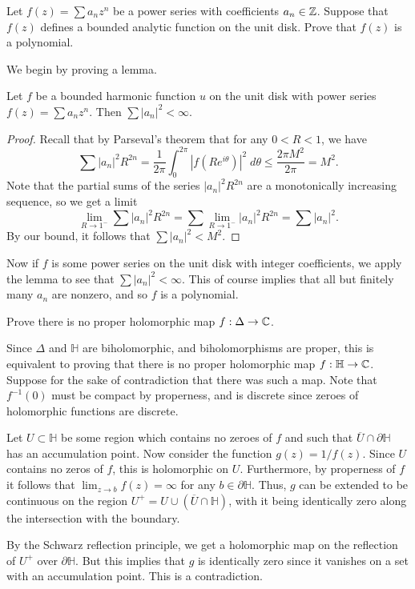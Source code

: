 \documentclass{pset}
\begin{document}
\begin{problem}{1.48}
  Let $f(z) = \sum a_n z^n$ be a power series with coefficients $a_n \in \mathbb{Z}$. Suppose that $f(z)$ defines a bounded analytic function on the unit disk. Prove that $f(z)$ is a polynomial.
\end{problem}

\begin{solution}
  We begin by proving a lemma.
  \begin{claim}
    Let $f$ be a bounded harmonic function $u$ on the unit disk with power series $f(z)=\sum a_n z^n$. Then $\sum |a_n|^2 < \infty$.
  \end{claim}

  \begin{proof}
    Recall that by Parseval's theorem that for any $0<R<1$, we have
    \[
      \sum |a_n|^2 R^{2n} = \frac{1}{2\pi} \int_0^{2\pi}|f(Re^{i\theta})|^2\;d\theta \leq \frac{2\pi M^2}{2\pi} = M^2.
    \]
    Note that the partial sums of the series $|a_n|^2R^{2n}$ are a monotonically increasing sequence, so we get a limit
    \[\lim_{R\to 1^-}\sum |a_n|^2 R^{2n} = \sum \lim_{R \to 1^-}|a_n|^2 R^{2n}  = \sum |a_n|^2.\]
    By our bound, it follows that $\sum |a_n|^2<M^2$.
  \end{proof}

  Now if $f$ is some power series on the unit disk with integer coefficients, we apply the lemma to see that $\sum |a_n|^2 < \infty$. This of course implies that all but finitely many $a_n$ are nonzero, and so $f$ is a polynomial.
\end{solution}

\begin{problem}{2.1}
  Prove there is no proper holomorphic map $f: \Delta \to \mathbb{C}$.
\end{problem}

\begin{solution}
  Since $\Delta$ and $\mathbb{H}$ are biholomorphic, and biholomorphisms are proper, this is equivalent to proving that there is no proper holomorphic map $f : \mathbb{H} \to \mathbb{C}$. Suppose for the sake of contradiction that there was such a map. 
  Note that $f^{-1}(0)$ must be compact by properness, and is discrete since zeroes of holomorphic functions are discrete. 

  Let $U\subset \mathbb{H}$ be some region which contains no zeroes of $f$ and such that $\overline{U}\cap \partial\mathbb{H}$ has an accumulation point. Now consider the function $g(z) = 1/f(z)$. Since $U$ contains no zeros of $f$, this is holomorphic on $U$. Furthermore, by properness of $f$ it follows that $\lim_{z\to b} f(z)=\infty$ for any $b\in \partial\mathbb{H}$. Thus, $g$ can be extended to be continuous on the region $U^+ = U\cup (\overline{U}\cap \mathbb{H})$, with it being identically zero along the intersection with the boundary. 

  By the Schwarz reflection principle, we get a holomorphic map on the reflection of $U^+$ over $\partial\mathbb{H}$. But this implies that $g$ is identically zero since it vanishes on a set with an accumulation point. This is a contradiction.
\end{solution}
\end{document}
